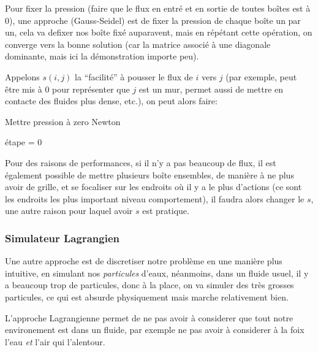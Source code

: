 \documentclass{article}
\begin{document}
Pour fixer la pression (faire que le flux en entré et en sortie de toutes boîtes est à 0), une approche (Gauss-Seidel) est de fixer la pression  de chaque boîte un par un, cela va defixer nos boîte fixé auparavent, mais en répétant cette opération, on converge vers la bonne solution (car la matrice associé à une diagonale dominante, mais ici la démonstration importe peu).

Appelons \(s(i, j)\) la ``facilité'' à pousser le flux de \(i\) vers \(j\) (par exemple, peut être mis à 0 pour représenter que \(j\) est un mur, permet aussi de mettre en contacte des fluides plus dense, etc.), on peut alors faire:

\begin{algorithm}
    \caption{Mettre pression à zero Newton}
    étape = 0 \;
\end{algorithm}

Pour des raisons de performances, si il n'y a pas beaucoup de flux, il est également possible de mettre plusieurs boîte ensembles, de manière à ne plus avoir de grille, et se focaliser sur les endroits où il y a le plus d'actions (ce sont les endroits les plus important niveau comportement), il faudra alors changer le \(s\), une autre raison pour laquel avoir \(s\) est pratique.

\subsubsection{Simulateur Lagrangien}

Une autre approche est  de discretiser notre problème en une manière plus intuitive, en simulant nos {\emph {particules}} d'eaux, néanmoins, dans un fluide usuel, il y a beaucoup trop de particules, donc à la place, on va simuler des très grosses particules, ce qui est absurde physiquement mais marche relativement bien.

L'approche Lagrangienne permet de ne pas avoir à considerer que tout notre environement est dans un fluide, par exemple ne pas avoir à considerer à la foix l'eau {\emph {et}} l'air qui l'alentour.
\end{document}
